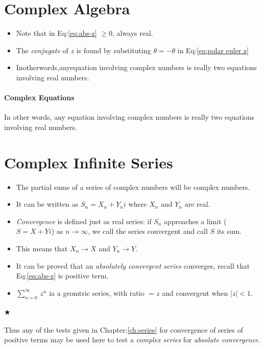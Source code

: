         \section{Complex Algebra}
            \begin{itemize}
                \item Note that in Eq:\eqref{eq:abs-z} $\ge0$, always real.
                \item The \textit{conjugate} of $z$ is found by substituting $\theta=-\theta$ in Eq:\eqref{eq:polar euler z}
                \item Inotherwords,anyequation involving complex numbers is really two equations involving real numbers.
            \end{itemize}
        \paragraph{Complex Equations}
        In other words, any equation involving complex numbers is really two equations involving real numbers.
            
        \section{Complex Infinite Series}
            \begin{itemize}
                \item The partial sums of a series of complex numbers will be complex numbers.
                \item It can be written as \colorbox{c1}{$S_n=X_n+Y_ni$} where $X_n$ and $Y_n$ are real.
                \item \textit{Convergence} is defined just as real series: if $S_n$ approaches a limit
                ($S=X+Yi$) as $n\to\infty$, we call the series convergent and call $S$ its sum.
                \item This means that $X_n \to X$ and $Y_n \to Y$.
                \item It can be proved that an \textit{absolutely convergent series} converges, 
                recall that Eq:\eqref{eq:abs-z} is positive term.
                \item $\sum_{n=0}^\infty \, z^n$ ia a geomtric series, with ratio $=z$ 
                and convergent when $|z|<1$.
            \end{itemize}
            \paragraph{$\bigstar$} Thus any of the tests given in Chapter:\ref{ch:series} for convergence of 
            series of positive terms may be used here to test a \textit{complex series} for \textit{absolute convergence}.

